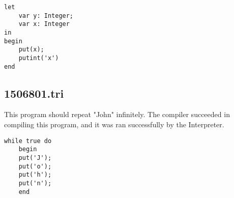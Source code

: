 \documentclass{article}
\begin{document}
\begin{lstlisting}
let
	var y: Integer;
	var x: Integer
in
begin
	put(x);
	putint('x')
end
\end{lstlisting}

\subsection{1506801.tri}
This program should repeat "John" infinitely. The compiler succeeded in compiling this program, and it was ran successfully by the Interpreter.

\begin{lstlisting}
while true do 
    begin
   	put('J');
	put('o');
	put('h');
	put('n');
    end
\end{lstlisting}
\end{document}
